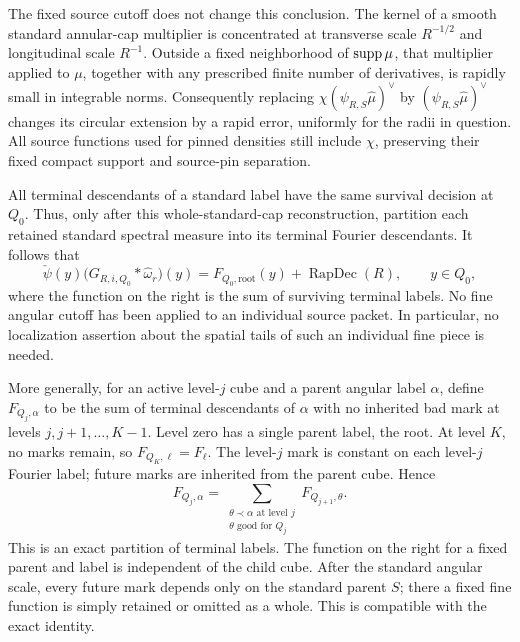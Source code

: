The fixed source cutoff does not change this conclusion. The kernel of
a smooth standard annular-cap multiplier is concentrated at transverse
scale \(R^{-1/2}\) and longitudinal scale \(R^{-1}\). Outside a fixed
neighborhood of \(\operatorname{supp}\mu\), that multiplier applied to \(\mu\),
together with any prescribed finite number of derivatives, is rapidly
small in integrable norms. Consequently replacing
\(\chi(\psi_{R,S}\widehat\mu)^\vee\) by
\((\psi_{R,S}\widehat\mu)^\vee\) changes its circular extension by a
rapid error, uniformly for the radii in question. All source functions
used for pinned densities still include \(\chi\), preserving their
fixed compact support and source-pin separation.

All terminal descendants of a standard label have the same survival
decision at \(Q_0\). Thus, only after this whole-standard-cap
reconstruction, partition each retained standard spectral measure into
its terminal Fourier descendants. It follows that
\begin{equation}\label{uf:initialidentity}
 \check\psi(y)
 \big(G_{R,i,Q_0}*\widehat\omega_r\big)(y)
 =F_{Q_0,\mathrm{root}}(y)+\operatorname{RapDec}(R),
 \qquad y\in Q_0,
\end{equation}
where the function on the right is the sum of surviving terminal labels.
No fine angular cutoff has been applied to an individual source packet.
In particular, no localization assertion about the spatial tails of such
an individual fine piece is needed.

More generally, for an active level-\(j\) cube and a parent angular
label \(\alpha\), define \(F_{Q_j,\alpha}\) to be the sum of terminal
descendants of \(\alpha\) with no inherited bad mark at levels
\(j,j+1,\ldots,K-1\). Level zero has a single parent label, the root.
At level \(K\), no marks remain, so \(F_{Q_K,\ell}=F_\ell\).
The level-\(j\) mark is constant on each level-\(j\) Fourier label;
future marks are inherited from the parent cube. Hence
\begin{equation}\label{fprof:identity}
 F_{Q_j,\alpha}
 =\sum_{\substack{\theta\prec\alpha\text{ at level }j\\
                    \theta\text{ good for }Q_j}}
       F_{Q_{j+1},\theta}.
\end{equation}
This is an exact partition of terminal labels. The function on the right
for a fixed parent and label is independent of the child cube. After
the standard angular scale, every future mark depends only on the
standard parent \(S\); there a fixed fine function is simply retained
or omitted as a whole. This is compatible with the exact identity.


